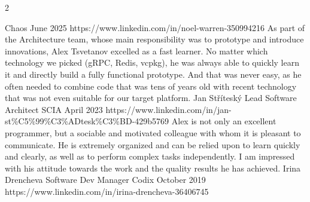\documentclass[pastel]{simplehipstercv}
\begin{document}
\begin{paracol}{2}
{    {Chaos}
    {June 2025}
    {https://www.linkedin.com/in/noel-warren-350994216}
\cvhline
\cvreference
    {As part of the Architecture team, whose main responsibility was to prototype and introduce innovations, Alex Tsvetanov excelled as a fast learner. No matter which technology we picked (gRPC, Redis, vcpkg), he was always able to quickly learn it and directly build a fully functional prototype. And that was never easy, as he often needed to combine code that was tens of years old with recent technology that was not even suitable for our target platform.}
    {}{Jan Stříteský}
    {Lead Software Architect}
    {SCIA}
    {April 2023}
    {https://www.linkedin.com/in/jan-st\%C5\%99\%C3\%ADtesk\%C3\%BD-429b5769}
\cvhline
\cvreference
    {Alex is not only an excellent programmer, but a sociable and motivated colleague with whom it is pleasant to communicate. He is extremely organized and can be relied upon to learn quickly and clearly, as well as to perform complex tasks independently. I am impressed with his attitude towards the work and the quality results he has achieved.}
    {}{Irina Drencheva}
    {Software Dev Manager}
    {Codix}
    {October 2019}
    {https://www.linkedin.com/in/irina-drencheva-36406745}

\newpage
{} \\%

}
\end{paracol}
\end{document}
